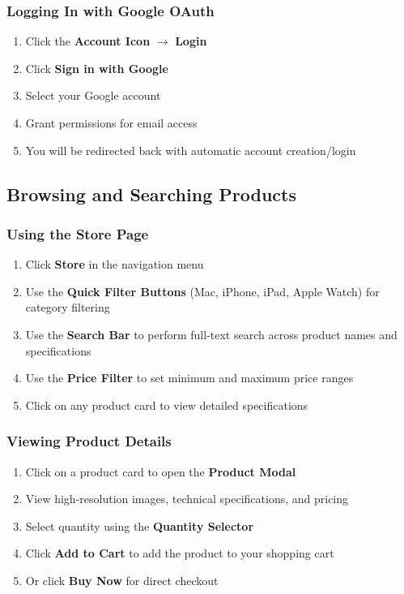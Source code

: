 \documentclass[12pt, a4paper]{report}
\begin{document}
{{\subsubsection{Logging In with Google OAuth}

\begin{enumerate}
    \item Click the \textbf{Account Icon} $\rightarrow$ \textbf{Login}
    \item Click \textbf{Sign in with Google}
    \item Select your Google account
    \item Grant permissions for email access
    \item You will be redirected back with automatic account creation/login
\end{enumerate}

\subsection{Browsing and Searching Products}

\subsubsection{Using the Store Page}

\begin{enumerate}
    \item Click \textbf{Store} in the navigation menu
    \item Use the \textbf{Quick Filter Buttons} (Mac, iPhone, iPad, Apple Watch) for category filtering
    \item Use the \textbf{Search Bar} to perform full-text search across product names and specifications
    \item Use the \textbf{Price Filter} to set minimum and maximum price ranges
    \item Click on any product card to view detailed specifications
\end{enumerate}

\subsubsection{Viewing Product Details}

\begin{enumerate}
    \item Click on a product card to open the \textbf{Product Modal}
    \item View high-resolution images, technical specifications, and pricing
    \item Select quantity using the \textbf{Quantity Selector}
    \item Click \textbf{Add to Cart} to add the product to your shopping cart
    \item Or click \textbf{Buy Now} for direct checkout
\end{enumerate}

}}
\end{document}
